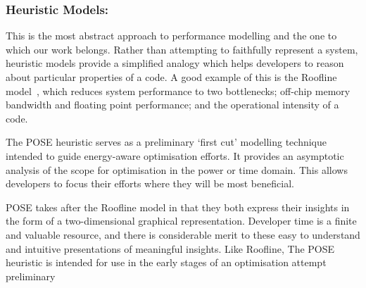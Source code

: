 \subsubsection{Heuristic Models:}
This is the most abstract approach to performance modelling and the one to which our work belongs.
Rather than attempting to faithfully represent a system, heuristic models provide a simplified analogy which helps developers to reason about particular properties of a code.
A good example of this is the Roofline model~\cite{williams:2009aa}, which reduces system performance to two bottlenecks; off-chip memory bandwidth and floating point performance; and the operational intensity of a code.

The POSE heuristic serves as a preliminary `first cut' modelling technique intended to guide energy-aware optimisation efforts.
It provides an asymptotic analysis of the scope for optimisation in the power or time domain.
This allows developers to focus their efforts where they will be most beneficial.

POSE takes after the Roofline model in that they both express their insights in the form of a two-dimensional graphical representation.
Developer time is a finite and valuable resource, and there is considerable merit to these easy to understand and intuitive presentations of meaningful insights.
Like Roofline, The POSE heuristic is intended for use in the early stages of an optimisation attempt preliminary 



